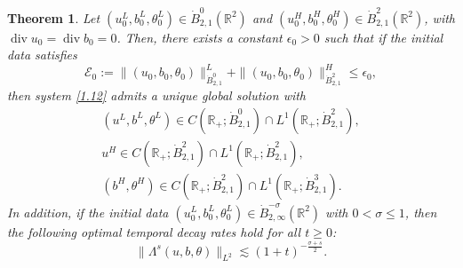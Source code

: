 \documentclass[10pt,a4paper]{amsart}
\numberwithin{equation}{section}
\newtheorem{theorem}{Theorem}[section]
\begin{document}
 \begin{theorem}\label{thm3}
 Let $(u_0^L, b_0^L, \theta_0^L)\in \dot{B}^0_{2,1}(\mathbb{R}^2)$ and
 $(u_0^H, b_0^H, \theta_0^H)\in \dot{B}^2_{2,1}(\mathbb{R}^2)$, with
 $\operatorname{div} u_0=\operatorname{div} b_0=0$. Then, there exists a
constant $\epsilon_0>0$ such that if the initial data satisfies
\begin{equation} \label{1.10}
 \mathcal{E}_0:=\|(u_0,b_0,\theta_0)\|_{\dot{B}^0_{2,1}}^L+\|(u_0,b_0,\theta_0)\|_{\dot{B}^2_{2,1}}^H\leqslant\epsilon_0,
\end{equation}
then system \eqref{1.12} admits a unique global solution with
\begin{equation} \label{1.11}
\begin{gathered}
(u^L,b^L,\theta^L)\in C(\mathbb{R}_+;\dot{B}^0_{2,1})\cap L^1(\mathbb{R}_+;\dot{B}^2_{2,1}),\\
u^H\in C(\mathbb{R}_+;\dot{B}^2_{2,1})\cap L^1(\mathbb{R}_+;\dot{B}^2_{2,1}), \\
(b^H,\theta^H)\in C(\mathbb{R}_+;\dot{B}^2_{2,1})\cap L^1(\mathbb{R}_+;\dot{B}^3_{2,1}).
 \end{gathered}
\end{equation}
 In addition, if the initial data $(u_0^L,b_0^L,\theta_0^L)\in \dot{B}^{-\sigma}_{2,\infty}(\mathbb{R}^2)$
 with $0<\sigma\leqslant 1$, then
 the following optimal temporal decay rates hold for all $t\geqslant 0$:
 \begin{equation} \label{1.16}
 \|\Lambda^s(u,b,\theta)\|_{L^2}\lesssim(1+t)^{-\frac{\sigma+s}{2}}.
 \end{equation}
 \end{theorem}
\end{document}
